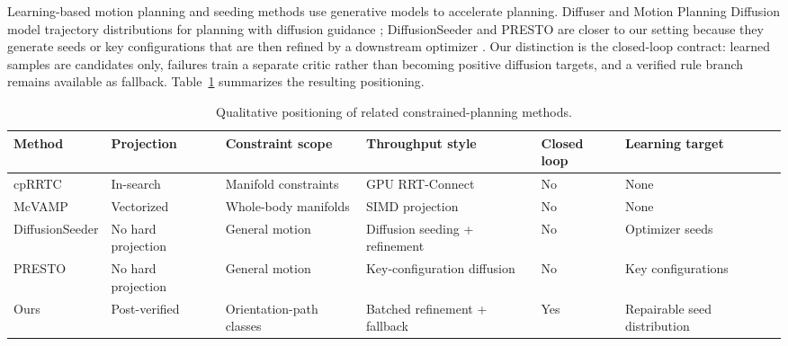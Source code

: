 \documentclass[conference]{IEEEtran/IEEEtran}
\begin{document}
Learning-based motion planning and seeding methods use generative models to
accelerate planning. Diffuser and Motion Planning Diffusion model trajectory
distributions for planning with diffusion guidance \cite{diffuser2022,mpd2023};
DiffusionSeeder and PRESTO are closer to our setting because they generate seeds
or key configurations that are then refined by a downstream optimizer
\cite{diffusionseeder2024,presto2024}. Our distinction is the closed-loop
contract: learned samples are candidates only, failures train a separate critic
rather than becoming positive diffusion targets, and a verified rule branch
remains available as fallback. Table~\ref{tab:related} summarizes the resulting
positioning.

\begin{table}[t]
\caption{Qualitative positioning of related constrained-planning methods.}
\label{tab:related}
\centering
\scriptsize
\begin{tabular}{llllll}
\toprule
Method & Projection & Constraint scope & Throughput style & Closed loop & Learning target \\
\midrule
cpRRTC \cite{cprrtc2025} & In-search & Manifold constraints & GPU RRT-Connect & No & None \\
McVAMP \cite{mcvamp2026} & Vectorized & Whole-body manifolds & SIMD projection & No & None \\
DiffusionSeeder \cite{diffusionseeder2024} & No hard projection & General motion & Diffusion seeding + refinement & No & Optimizer seeds \\
PRESTO \cite{presto2024} & No hard projection & General motion & Key-configuration diffusion & No & Key configurations \\
Ours & Post-verified & Orientation-path classes & Batched refinement + fallback & Yes & Repairable seed distribution \\
\bottomrule
\end{tabular}
\end{table}
\end{document}
